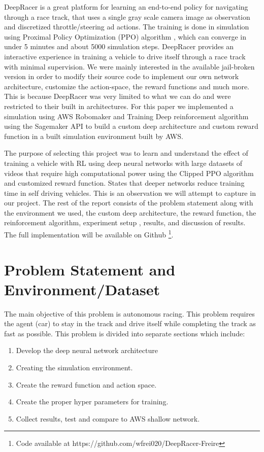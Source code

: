 \documentclass[journal]{IEEEtran}
\begin{document}
DeepRacer is a great platform for learning an end-to-end policy for navigating through a race track, that uses a single gray scale camera image as observation and discretized throttle/steering ad actions. The training is done in simulation using Proximal Policy Optimization (PPO) algorithm \cite{schulman2017proximal}, which can converge in under 5 minutes and about 5000 simulation steps. DeepRacer provides an interactive experience in training a vehicle to drive itself through a race track with minimal supervision. We were mainly interested in the available jail-broken version in order to modify their source code to implement our own network architecture, customize the action-space, the reward functions and much more.  This is because DeepRacer was very limited to what we can do and were restricted to their built in architectures. For this paper we implemented a simulation using AWS Robomaker and Training Deep reinforcement algorithm using the Sagemaker API to build a custom deep architecture and custom reward function in a built simulation environment built by AWS.  

The purpose of selecting this project was to learn and understand the effect of training a vehicle with RL using deep neural networks with large datasets of videos that require high computational power using the Clipped PPO algorithm and customized reward function.  \cite{7830823} States that deeper networks reduce training time in self driving vehicles.  This is an observation we will attempt to capture in our project.  The rest of the report consists of the problem statement along with the environment we used, the custom deep architecture, the reward function, the reinforcement algorithm, experiment setup , results, and discussion of results.  The full implementation will be available on Github \footnote{ Code available at https://github.com/wfrei020/DeepRacer-Freire}.

\section{Problem Statement and Environment/Dataset}
The main objective of this problem is autonomous racing.  This problem requires the agent (car) to stay in the track and drive itself while completing the track as fast as possible.  This problem is divided into separate sections which include:

\begin{enumerate}
  \item Develop the deep neural network architecture
  \item Creating the simulation environment.
  \item Create the reward function and action space.
  \item Create the proper hyper parameters for training.
  \item Collect results, test and compare to AWS shallow network.
\end{enumerate}
\end{document}
